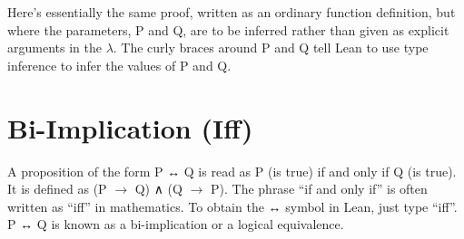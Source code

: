 \documentclass[letterpaper,10pt,english]{sphinxmanual}
\begin{document}
\begin{sphinxVerbatim}[commandchars=\\\{\}]
 
               
             
                 
\end{sphinxVerbatim}

Here’s essentially the same proof, written as an ordinary function
definition, but where the parameters, P and Q, are to be inferred
rather than given as explicit arguments in the \(\lambda\). The curly braces
around P and Q tell Lean to use type inference to infer the values of
P and Q.

\begin{sphinxVerbatim}[commandchars=\\\{\}]
              
         
\end{sphinxVerbatim}


\section{Bi-Implication (Iff)}
\label{\detokenize{15-proofs:bi-implication-iff}}
A proposition of the form P ↔ Q is read as P (is true) if and only if
Q (is true). It is defined as (P \(\rightarrow\) Q) ∧ (Q \(\rightarrow\) P). The phrase “if and
only if” is often written as “iff” in mathematics. To obtain the ↔
symbol in Lean, just type “iff”. P ↔ Q is known as a bi-implication
or a logical equivalence.
\end{document}
